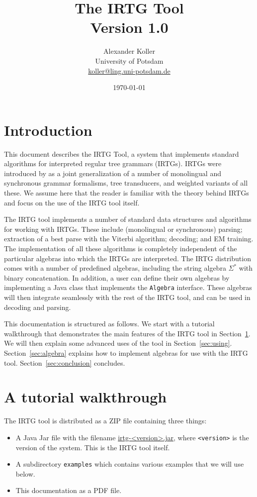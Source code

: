 \documentclass[11pt]{article}
\title{The IRTG Tool\\Version 1.0}
\author{Alexander Koller\\University of Potsdam\\\url{koller@ling.uni-potsdam.de}}
\date{\today}
\begin{document}
\maketitle

\tableofcontents
\clearpage

\section{Introduction} \label{sec:introduction}

This document describes the IRTG Tool, a system that implements
standard algorithms for interpreted regular tree grammars
(IRTGs). IRTGs were introduced by \cite{koller11} as a joint
generalization of a number of monolingual and synchronous grammar
formalisms, tree transducers, and weighted variants of all these.  We
assume here that the reader is familiar with the theory behind IRTGs
and focus on the use of the IRTG tool itself.

The IRTG tool implements a number of standard data structures and
algorithms for working with IRTGs. These include (monolingual or
synchronous) parsing; extraction of a best parse with the Viterbi
algorithm; decoding; and EM training. The implementation of all these
algorithms is completely independent of the particular algebras into
which the IRTGs are interpreted. The IRTG distribution comes with a
number of predefined algebras, including the string algebra $\Sigma^*$
with binary concatenation. In addition, a user can define their own
algebras by implementing a Java class that implements the
\verb?Algebra? interface. These algebras will then integrate
seamlessly with the rest of the IRTG tool, and can be used in decoding
and parsing.

This documentation is structured as follows. We start with a tutorial
walkthrough that demonstrates the main features of the IRTG tool in
Section~\ref{sec:introduction}.  We will then explain some advanced
uses of the tool in Section~\ref{sec:using}. Section~\ref{sec:algebra}
explains how to implement algebras for use with the IRTG
tool. Section~\ref{sec:conclusion} concludes.


\section{A tutorial walkthrough} \label{sec:tutorial}

The IRTG tool is distributed as a ZIP file containing three things:
\begin{itemize}
\item A Java Jar file with the filename \url{irtg-<version>.jar},
  where \verb?<version>? is the version of the system. This is the
  IRTG tool itself.
\item A subdirectory \verb?examples? which contains various examples
  that we will use below.
\item This documentation as a PDF file.
\end{itemize}
\end{document}
